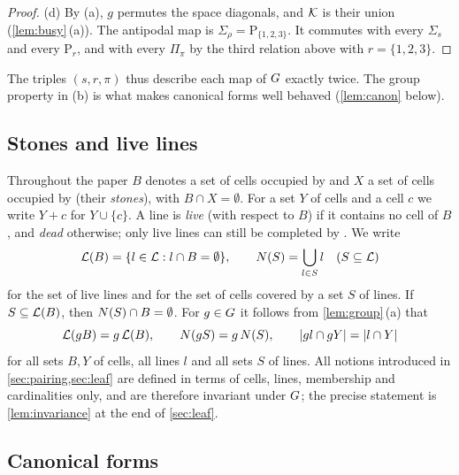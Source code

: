 \begin{proof}
(d) By (a), $g$ permutes the space diagonals, and $\mathcal{K}$ is their union (\cref{lem:busy}\,(a)). The
antipodal map is $\Sigma_\rho=\mathrm{P}_{\{1,2,3\}}$. It commutes with every $\Sigma_s$ and every
$\mathrm{P}_r$, and with every $\Pi_\pi$ by the third relation above with $r=\{1,2,3\}$.
\end{proof}

The triples $(s,r,\pi)$ thus describe each map of $G$ exactly twice. The group property in (b) is what
makes canonical forms well behaved (\cref{lem:canon} below).

\subsection{Stones and live lines}\label{ssec:live}

Throughout the paper $B$ denotes a set of cells occupied by \Breaker{} and $X$ a set of cells occupied by
\Maker{} (their \emph{stones}), with $B\cap X=\emptyset$. For a set $Y$ of cells and a cell $c$ we write
$Y+c$ for $Y\cup\{c\}$. A line is \emph{live} (with respect to $B$) if it contains no cell of $B$, and
\emph{dead} otherwise; only live lines can still be completed by \Maker. We write
\[
  \mathcal{L}(B)=\{l\in\mathcal{L} : l\cap B=\emptyset\},\qquad N(S)=\bigcup_{l\in S}l\quad(S\subseteq\mathcal{L})
\]
for the set of live lines and for the set of cells covered by a set $S$ of lines. If $S\subseteq\mathcal{L}(B)$,
then $N(S)\cap B=\emptyset$. For $g\in G$ it follows from \cref{lem:group}\,(a) that
\begin{equation}\label{eq:inv-basic}
  \mathcal{L}(gB)=g\,\mathcal{L}(B),\qquad N(gS)=g\,N(S),\qquad |gl\cap gY|=|l\cap Y|
\end{equation}
for all sets $B,Y$ of cells, all lines $l$ and all sets $S$ of lines. All notions introduced in
\cref{sec:pairing,sec:leaf} are defined in terms of cells, lines, membership and cardinalities only, and
are therefore invariant under $G$; the precise statement is \cref{lem:invariance} at the end of
\cref{sec:leaf}.

\subsection{Canonical forms}\label{ssec:canon}

